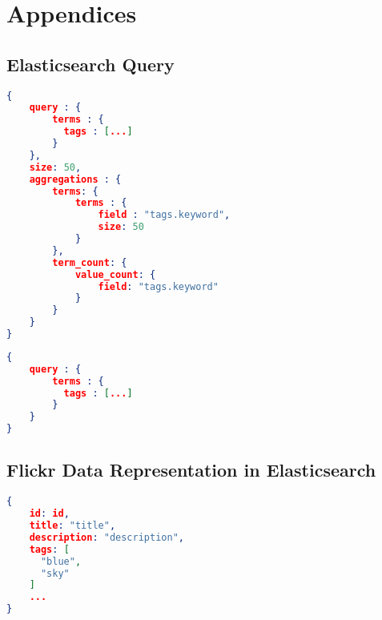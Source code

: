 \chapter{Appendices}

\section{Elasticsearch Query}
\begin{lstlisting}[language=json, caption={Initial query to retrive query expansion data}, label={ap:initial-query}]
{
    query : {
        terms : {
          tags : [...]
        }
    },
    size: 50,
    aggregations : {
        terms: {
            terms : {
                field : "tags.keyword",
                size: 50
            }
        },
        term_count: {
            value_count: {
                field: "tags.keyword"
            }
        }
    }
}
\end{lstlisting}

\begin{lstlisting}[language=json, caption={Search for photos with query expanded terms}, label={ap:final-query}]
{
    query : {
        terms : {
          tags : [...]
        }
    }
}
\end{lstlisting}

\section{Flickr Data Representation in Elasticsearch}
\begin{lstlisting}[language={json}, caption={Internal photo data representation in elasticsearch}, label={ap:flickr-data}]
{
    id: id,
    title: "title",
    description: "description",
    tags: [
      "blue",
      "sky"
    ]
    ...
}
\end{lstlisting}
